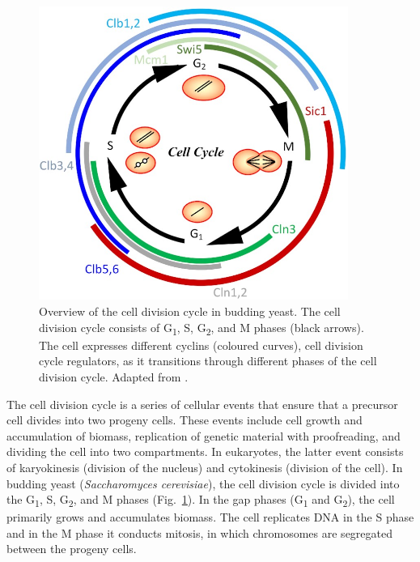 \begin{figure}
  \centering
  \includegraphics[width=0.9\textwidth]{adlerYeastCellCycle2022_1}
  \caption[
    Overview of the cell division cycle
  ]{
    Overview of the cell division cycle in budding yeast.
    The cell division cycle consists of G\textsubscript{1}, S, G\textsubscript{2}, and M phases (black arrows).
    The cell expresses different cyclins (coloured curves), cell division cycle regulators, as it transitions through different phases of the cell division cycle.
    Adapted from \textcite{adlerYeastCellCycle2022}.}
  \label{fig:intro-cdc-overview}
\end{figure}

The cell division cycle is a series of cellular events that ensure that a precursor cell divides into two progeny cells.
These events include cell growth and accumulation of biomass, replication of genetic material with proofreading, and dividing the cell into two compartments.
In eukaryotes, the latter event consists of karyokinesis (division of the nucleus) and cytokinesis (division of the cell).
In budding yeast (\textit{Saccharomyces cerevisiae}), the cell division cycle is divided into the G\textsubscript{1}, S, G\textsubscript{2}, and M phases (Fig.\ \ref{fig:intro-cdc-overview}).
In the gap phases (G\textsubscript{1} and G\textsubscript{2}), the cell primarily grows and accumulates biomass.
The cell replicates DNA in the S phase and in the M phase it conducts mitosis, in which chromosomes are segregated between the progeny cells.

